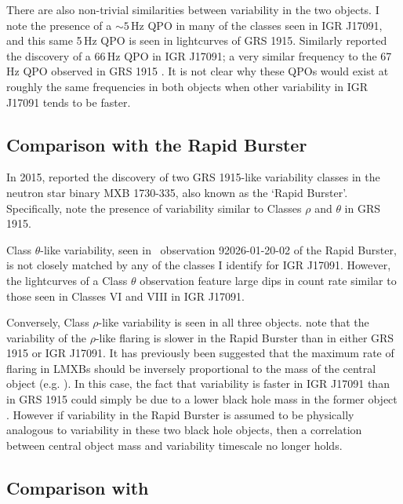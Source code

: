 \par There are also non-trivial similarities between variability in the two objects.  I note the presence of a $\sim5$\,Hz QPO in many of the classes seen in IGR J17091, and this same 5\,Hz QPO is seen in lightcurves of GRS 1915.  Similarly \citet{Altamirano_HFQPO} reported the discovery of a 66\,Hz QPO in IGR J17091; a very similar frequency to the 67\,Hz QPO observed in GRS 1915 \citep{Morgan_QPO}.  It is not clear why these QPOs would exist at roughly the same frequencies in both objects when other variability in IGR J17091 tends to be faster.

\subsection{Comparison with the Rapid Burster}

\par In 2015, \citet{Bagnoli_RB} reported the discovery of two GRS 1915-like variability classes in the neutron star binary MXB 1730-335, also known as the `Rapid Burster'.  Specifically, \citet{Bagnoli_RB} note the presence of variability similar to Classes $\rho$ and $\theta$ in GRS 1915.
\par Class $\theta$-like variability, seen in \rxte\ observation 92026-01-20-02 of the Rapid Burster, is not closely matched by any of the classes I identify for IGR J17091.  However, the lightcurves of a Class $\theta$ observation feature large dips in count rate similar to those seen in Classes VI and VIII in IGR J17091.
\par Conversely, Class $\rho$-like variability is seen in all three objects.  \citet{Bagnoli_RB} note that the variability of the $\rho$-like flaring is slower in the Rapid Burster than in either GRS 1915 or IGR J17091. It has previously been suggested that the maximum rate of flaring in LMXBs should be inversely proportional to the mass of the central object (e.g. \citealp{Belloni_Timescales,Frank_Timescales}).  In this case, the fact that variability is faster in IGR J17091 than in GRS 1915 could simply be due to a lower black hole mass in the former object \citep{Altamirano_IGR_FH}.  However if variability in the Rapid Burster is assumed to be physically analogous to variability in these two black hole objects, then a correlation between central object mass and variability timescale no longer holds.

\subsection{Comparison with \citealp{Altamirano_IGR_FH}}

